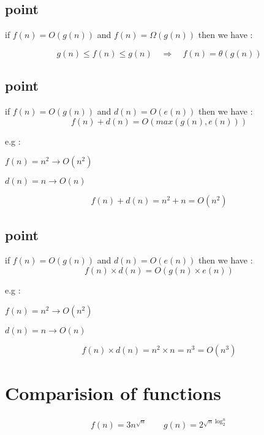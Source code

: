 \documentclass[12pt]{article}
\begin{document}
\subsection{point}

\begin{tcolorbox}
if
$f(n) = O(g(n))$
and
$f(n) = \Omega(g(n))$
then we have :
\end{tcolorbox}


$$
g(n) \leq  f(n)  \leq g(n) \quad \Rightarrow \quad f(n) = \theta(g(n))
$$




\subsection{point}

\begin{tcolorbox}
if
$f(n) = O(g(n))$
and
$d(n) = O(e(n))$
then we have :
$$
f(n) + d(n) = O( max(g(n),e(n)) )
$$
\end{tcolorbox}


e.g : 

$f(n) = n^{2} \to O(n^{2})$

$d(n) = n \to O(n)$

$$
f(n) + d(n) = n^{2} + n =  O( n^{2} )
$$





\subsection{point}

\begin{tcolorbox}
if
$f(n) = O(g(n))$
and
$d(n) = O(e(n))$
then we have :
$$
f(n) \times d(n) = O( g(n) \times e(n) )
$$
\end{tcolorbox}


e.g : 

$f(n) = n^{2} \to O(n^{2})$

$d(n) = n \to O(n)$

$$
f(n) \times d(n) = n^{2} \times n = n^{3} =  O( n^{3} )
$$


\newpage

\section{Comparision of functions}

{
\LARGE
\begin{align*}
f(n) = 3 n^{\sqrt{n}}  \qquad g(n) = 2^{\sqrt{n}\log^{n}_{2}} 
\end{align*}
}
\end{document}
